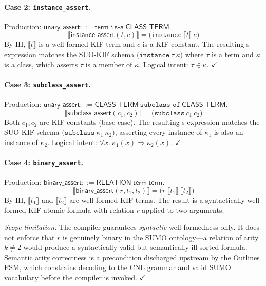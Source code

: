 \paragraph{Case 2: \texttt{instance\_assert}.}
Production: $\mathsf{unary\_assert} ::= \mathsf{term}\ \texttt{is-a}\ \mathsf{CLASS\_TERM}$.
\begin{equation*}
  \llbracket \mathsf{instance\_assert}(t, c) \rrbracket
    = \texttt{(instance}\ \llbracket t \rrbracket\ c\texttt{)}
\end{equation*}
By IH, $\llbracket t \rrbracket$ is a well-formed KIF term and $c$ is a KIF constant.
The resulting s-expression matches the SUO-KIF schema
$\texttt{(instance}\ \tau\ \kappa\texttt{)}$ where $\tau$ is a term and $\kappa$ is a
class, which asserts $\tau$ is a member of $\kappa$.
Logical intent: $\tau \in \kappa$. \hfill$\checkmark$

\paragraph{Case 3: \texttt{subclass\_assert}.}
Production: $\mathsf{unary\_assert} ::= \mathsf{CLASS\_TERM}\ \texttt{subclass-of}\ \mathsf{CLASS\_TERM}$.
\begin{equation*}
  \llbracket \mathsf{subclass\_assert}(c_1, c_2) \rrbracket
    = \texttt{(subclass}\ c_1\ c_2\texttt{)}
\end{equation*}
Both $c_1, c_2$ are KIF constants (base case). The resulting s-expression matches
the SUO-KIF schema $\texttt{(subclass}\ \kappa_1\ \kappa_2\texttt{)}$, asserting
every instance of $\kappa_1$ is also an instance of $\kappa_2$.
Logical intent: $\forall x.\ \kappa_1(x) \Rightarrow \kappa_2(x)$. \hfill$\checkmark$

\paragraph{Case 4: \texttt{binary\_assert}.}
Production: $\mathsf{binary\_assert} ::= \mathsf{RELATION}\ \mathsf{term}\ \mathsf{term}$.
\begin{equation*}
  \llbracket \mathsf{binary\_assert}(r, t_1, t_2) \rrbracket
    = \texttt{(}r\ \llbracket t_1 \rrbracket\ \llbracket t_2 \rrbracket\texttt{)}
\end{equation*}
By IH, $\llbracket t_1 \rrbracket$ and $\llbracket t_2 \rrbracket$ are well-formed KIF
terms. The result is a syntactically well-formed KIF atomic formula with relation $r$
applied to two arguments.

\textit{Scope limitation:} The compiler guarantees \emph{syntactic} well-formedness
only. It does not enforce that $r$ is genuinely binary in the SUMO ontology---a
relation of arity $k \neq 2$ would produce a syntactically valid but semantically
ill-sorted formula. Semantic arity correctness is a precondition discharged upstream
by the Outlines FSM, which constrains decoding to the CNL grammar and valid SUMO
vocabulary before the compiler is invoked. \hfill$\checkmark$

